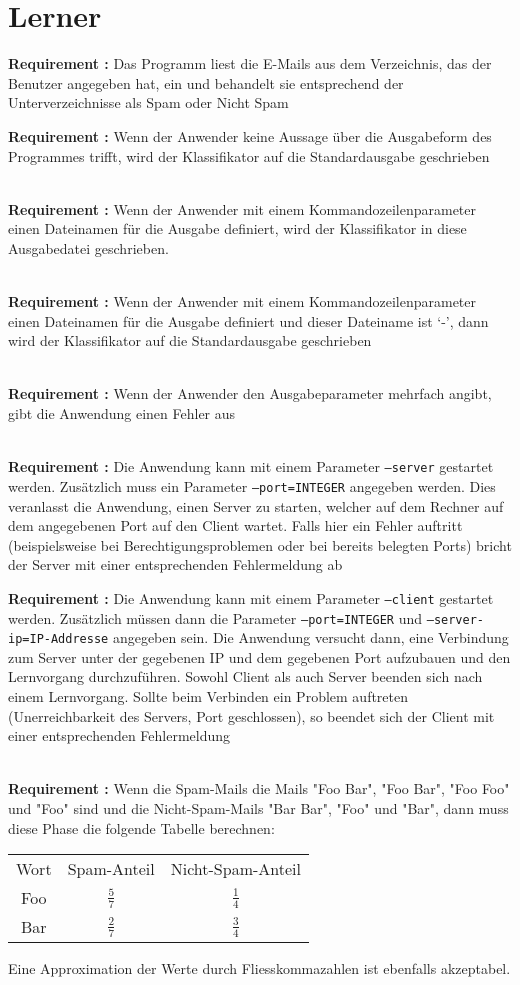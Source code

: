 \documentclass{article}
\newcounter{requirementscount}{}
\newcommand{\requirement}[1] {
        \addtocounter{requirementscount}{1}
        {\bf Requirement \therequirementscount:} #1\\
    }
\begin{document}
\section{Lerner}
\requirement{Das Programm liest die E-Mails aus dem
Verzeichnis, das der Benutzer angegeben hat, ein und 
behandelt sie entsprechend der Unterverzeichnisse als Spam
oder Nicht Spam}
\requirement{Wenn der Anwender keine Aussage \"uber die Ausgabeform des
Programmes trifft, wird der Klassifikator auf die Standardausgabe geschrieben}\\
\requirement{Wenn der Anwender mit einem Kommandozeilenparameter einen
Dateinamen f\"ur die Ausgabe definiert, wird der Klassifikator in diese
Ausgabedatei geschrieben.}\\
\requirement{Wenn der Anwender mit einem Kommandozeilenparameter
einen Dateinamen f\"ur die Ausgabe definiert und dieser Dateiname
ist `-', dann wird der Klassifikator auf die Standardausgabe 
geschrieben}\\
\requirement{Wenn der Anwender den Ausgabeparameter mehrfach angibt,
gibt die Anwendung einen Fehler aus}\\
\requirement{Die Anwendung kann mit einem Parameter \texttt{--server} gestartet
werden. Zus\"atzlich muss ein Parameter \texttt{--port=INTEGER} angegeben werden.
Dies veranlasst die Anwendung, einen Server zu starten, welcher auf dem
Rechner auf dem angegebenen Port auf den Client wartet. Falls hier ein
Fehler auftritt (beispielsweise bei Berechtigungsproblemen oder bei
bereits belegten Ports) bricht der Server mit einer entsprechenden Fehlermeldung
ab}
\requirement{Die Anwendung kann mit einem Parameter \texttt{--client} gestartet
werden. Zus\"atzlich m\"ussen dann die Parameter \texttt{--port=INTEGER}
und \texttt{--server-ip=IP-Addresse} angegeben sein. Die Anwendung versucht
dann, eine Verbindung zum Server unter der gegebenen IP und dem gegebenen
Port aufzubauen und den Lernvorgang durchzuf\"uhren. Sowohl Client als
auch Server beenden sich nach einem Lernvorgang. Sollte beim Verbinden
ein Problem auftreten (Unerreichbarkeit des Servers, Port geschlossen),
so beendet sich der Client mit einer entsprechenden Fehlermeldung}\\
\requirement{Wenn die Spam-Mails die Mails "Foo Bar", "Foo Bar", "Foo Foo"
und "Foo" sind und die Nicht-Spam-Mails "Bar Bar", "Foo" und "Bar", 
dann muss diese Phase die folgende Tabelle berechnen:\\
\begin{center}
\begin{tabular}{c c c}
Wort & Spam-Anteil & Nicht-Spam-Anteil \\
Foo & \(\frac{5}{7}\) & \(\frac{1}{4}\) \\
Bar & \(\frac{2}{7}\) & \(\frac{3}{4}\)
\end{tabular}
\end{center}
Eine Approximation der Werte durch Fliesskommazahlen ist
ebenfalls akzeptabel.}
\end{document}
